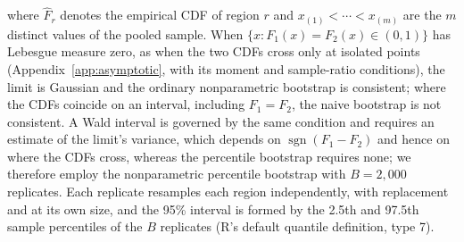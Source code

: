 \documentclass[AMA,Times1COL]{WileyNJDv5}
\begin{document}
where $\hat{F}_r$ denotes the empirical CDF of region $r$ and $x_{(1)} < \cdots < x_{(m)}$ are the $m$ distinct values of the pooled sample. When $\{x : F_1(x) = F_2(x) \in (0,1)\}$ has Lebesgue measure zero, as when the two CDFs cross only at isolated points (Appendix~\ref{app:asymptotic}, with its moment and sample-ratio conditions), the limit is Gaussian and the ordinary nonparametric bootstrap is consistent;\cite{fang2019} where the CDFs coincide on an interval, including $F_1 = F_2$, the naive bootstrap is not consistent.\cite{dumbgen1993,fang2019} A Wald interval is governed by the same condition and requires an estimate of the limit's variance, which depends on $\operatorname{sgn}(F_1 - F_2)$ and hence on where the CDFs cross, whereas the percentile bootstrap requires none; we therefore employ the nonparametric percentile bootstrap with $B = 2{,}000$ replicates.\cite{efron1993} Each replicate resamples each region independently, with replacement and at its own size, and the 95\% interval is formed by the 2.5th and 97.5th sample percentiles of the $B$ replicates (R's default quantile definition, type 7).
\end{document}

